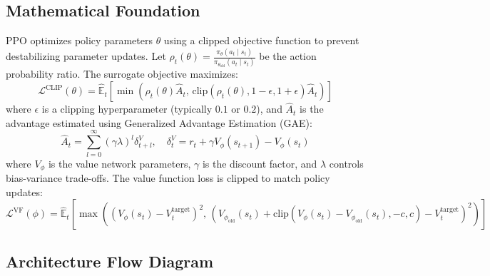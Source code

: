 \subsection{Mathematical Foundation}
PPO optimizes policy parameters $\theta$ using a clipped objective function to prevent destabilizing parameter updates. Let $\rho_t(\theta) = \frac{\pi_\theta(a_t \mid s_t)}{\pi_{\theta_{\text{old}}}(a_t \mid s_t)}$ be the action probability ratio. The surrogate objective maximizes:
\begin{equation}
  \mathcal{L}^{\text{CLIP}}(\theta) = \hat{\mathbb{E}}_t \left[ \min\left( \rho_t(\theta) \hat{A}_t, \, \text{clip}(\rho_t(\theta), 1-\epsilon, 1+\epsilon) \hat{A}_t \right) \right]
\end{equation}
where $\epsilon$ is a clipping hyperparameter (typically $0.1$ or $0.2$), and $\hat{A}_t$ is the advantage estimated using Generalized Advantage Estimation (GAE):
\begin{equation}
  \hat{A}_t = \sum_{l=0}^\infty (\gamma \lambda)^l \delta_{t+l}^V, \quad \delta_t^V = r_t + \gamma V_\phi(s_{t+1}) - V_\phi(s_t)
\end{equation}
where $V_\phi$ is the value network parameters, $\gamma$ is the discount factor, and $\lambda$ controls bias-variance trade-offs. The value function loss is clipped to match policy updates:
\begin{equation}
  \mathcal{L}^{\text{VF}}(\phi) = \hat{\mathbb{E}}_t \left[ \max\left( (V_\phi(s_t) - V_t^{\text{target}})^2, \, (V_{\phi_{\text{old}}}(s_t) + \text{clip}(V_\phi(s_t) - V_{\phi_{\text{old}}}(s_t), -c, c) - V_t^{\text{target}})^2 \right) \right]
\end{equation}

\subsection{Architecture Flow Diagram}

